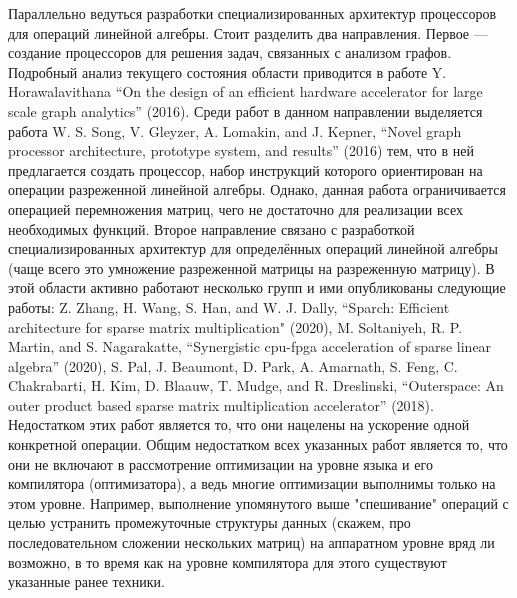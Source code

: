 \documentclass[12pt]{article}  %
\theoremstyle{remark}
\begin{document}
Параллельно ведуться разработки специализированных архитектур процессоров для операций линейной алгебры. Стоит разделить два направления. Первое --- создание процессоров для решения задач, связанных с анализом графов. Подробный анализ текущего состояния области приводится в работе Y. Horawalavithana “On the design of an efficient hardware accelerator for large scale graph analytics” (2016). Среди работ в данном направлении выделяется работа W. S. Song, V. Gleyzer, A. Lomakin, and J. Kepner, “Novel graph processor architecture, prototype system, and results” (2016) тем, что в ней предлагается создать процессор, набор инструкций которого ориентирован на операции разреженной линейной алгебры. Однако, данная работа ограничивается операцией перемножения матриц, чего не достаточно для реализации всех необходимых функций. Второе направление связано с разработкой специализированных архитектур для определённых операций линейной алгебры (чаще всего это умножение разреженной матрицы на разреженную матрицу). В этой области активно работают несколько групп и ими опубликованы следующие работы: Z. Zhang, H. Wang, S. Han, and W. J. Dally, “Sparch: Efficient architecture for sparse matrix multiplication" (2020), M. Soltaniyeh, R. P. Martin, and S. Nagarakatte, “Synergistic cpu-fpga acceleration of sparse linear algebra” (2020), S. Pal, J. Beaumont, D. Park, A. Amarnath, S. Feng, C. Chakrabarti, H. Kim, D. Blaauw, T. Mudge, and R. Dreslinski, “Outerspace: An outer product based sparse matrix multiplication accelerator” (2018). Недостатком этих работ является то, что они нацелены на ускорение одной конкретной операции. Общим недостатком всех указанных работ является то, что они не включают в рассмотрение оптимизации на уровне языка и его компилятора (оптимизатора), а ведь многие оптимизации выполнимы только на этом уровне. Например, выполнение упомянутого выше "спешивание" операций с целью устранить промежуточные структуры данных (скажем, про последовательном сложении нескольких матриц) на аппаратном уровне вряд ли возможно, в то время как на уровне компилятора для этого существуют указанные ранее техники.
\end{document}

